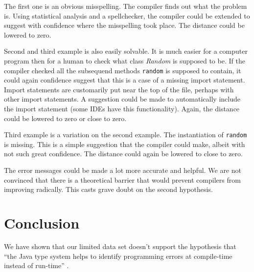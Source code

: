 \documentclass[10pt]{report}
\begin{document}
The first one is an obvious misspelling.  The compiler finds out what the problem is.  Using statistical analysis and a spellchecker, the compiler could be extended to suggest with confidence where the misspelling took place.  The distance could be lowered to zero.

Second and third example is also easily solvable.  It is much easier for a computer program then for a human to check what class {\em Random} is supposed to be.  If the compiler checked all the subsequend methods {\tt random} is supposed to contain, it could again confidence suggest that this is a case of a missing import statement.  Import statements are customarily put near the top of the file, perhaps with other import statements.  A suggestion could be made to automatically include the import statement (some IDEs have this functionality).  Again, the distance could be lowered to zero or close to zero.

Third example is a variation on the second example.  The instantiation of {\tt random} is missing.  This is a simple suggestion that the compiler could make, albeit with not such great confidence.  The distance could again be lowered to close to zero.

The error messages could be made a lot more accurate and helpful.  We are not convinced that there is a theoretical barrier that would prevent compilers from improving radically.  This casts grave doubt on the second hypothesis.

\section{Conclusion}

We have shown that our limited data set doesn't support the hypothesis that ``the Java type system helps to identify programming errors at compile-time instead of run-time'' \cite{bradley}.
\end{document}
